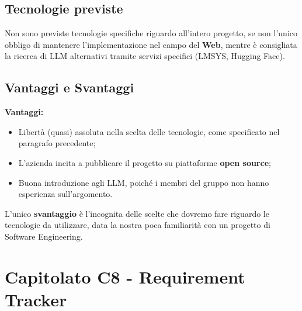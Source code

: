 \documentclass[10pt]{article}
\begin{document}
    \subsection{Tecnologie previste}
    Non sono previste tecnologie specifiche riguardo all'intero progetto, se non l'unico obbligo di mantenere l'implementazione
    nel campo del \textbf{Web}, mentre è consigliata la ricerca di LLM alternativi tramite servizi specifici (LMSYS, Hugging Face).
    
    \subsection{Vantaggi e Svantaggi}
    \textbf{Vantaggi:}
    \begin{itemize}
        \item Libertà (quasi) assoluta nella scelta delle tecnologie, come specificato nel paragrafo precedente;
        \item L'azienda incita a pubblicare il progetto su piattaforme \textbf{open source};
        \item Buona introduzione agli LLM, poiché i membri del gruppo non hanno esperienza sull'argomento.
    \end{itemize}
    L'unico \textbf{svantaggio} è l'incognita delle scelte che dovremo fare riguardo le tecnologie da utilizzare,
    data la nostra poca familiarità con un progetto di Software Engineering.


    \newpage
    \section{Capitolato C8 - Requirement Tracker}
\end{document}
